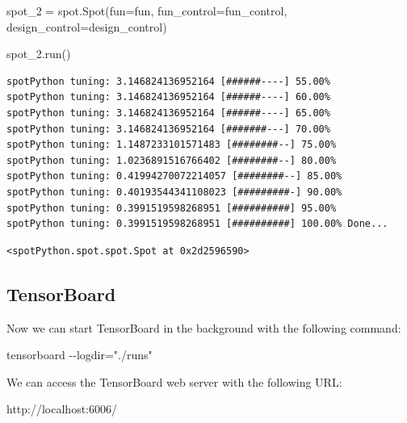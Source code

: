 \documentclass[
  letterpaper,
  DIV=11,
  numbers=noendperiod]{scrreprt}
\newenvironment{Shaded}{\begin{snugshade}}{\end{snugshade}}
\newcommand{\NormalTok}[1]{\textcolor[rgb]{0.00,0.23,0.31}{#1}}
\newcommand{\OperatorTok}[1]{\textcolor[rgb]{0.37,0.37,0.37}{#1}}
\begin{document}
\begin{Shaded}
\begin{Highlighting}[]
\NormalTok{spot\_2 }\OperatorTok{=}\NormalTok{ spot.Spot(fun}\OperatorTok{=}\NormalTok{fun,}
\NormalTok{                   fun\_control}\OperatorTok{=}\NormalTok{fun\_control,}
\NormalTok{                   design\_control}\OperatorTok{=}\NormalTok{design\_control)}
\end{Highlighting}
\end{Shaded}

\begin{Shaded}
\begin{Highlighting}[]
\NormalTok{spot\_2.run()}
\end{Highlighting}
\end{Shaded}

\begin{verbatim}
spotPython tuning: 3.146824136952164 [######----] 55.00% 
spotPython tuning: 3.146824136952164 [######----] 60.00% 
spotPython tuning: 3.146824136952164 [######----] 65.00% 
spotPython tuning: 3.146824136952164 [#######---] 70.00% 
spotPython tuning: 1.1487233101571483 [########--] 75.00% 
spotPython tuning: 1.0236891516766402 [########--] 80.00% 
spotPython tuning: 0.41994270072214057 [########--] 85.00% 
spotPython tuning: 0.40193544341108023 [#########-] 90.00% 
spotPython tuning: 0.3991519598268951 [##########] 95.00% 
spotPython tuning: 0.3991519598268951 [##########] 100.00% Done...
\end{verbatim}

\begin{verbatim}
<spotPython.spot.spot.Spot at 0x2d2596590>
\end{verbatim}

\subsection{TensorBoard}\label{tensorboard-8}

Now we can start TensorBoard in the background with the following
command:

\begin{Shaded}
\begin{Highlighting}[]
\NormalTok{tensorboard {-}{-}logdir="./runs"}
\end{Highlighting}
\end{Shaded}

We can access the TensorBoard web server with the following URL:

\begin{Shaded}
\begin{Highlighting}[]
\NormalTok{http://localhost:6006/}
\end{Highlighting}
\end{Shaded}
\end{document}
